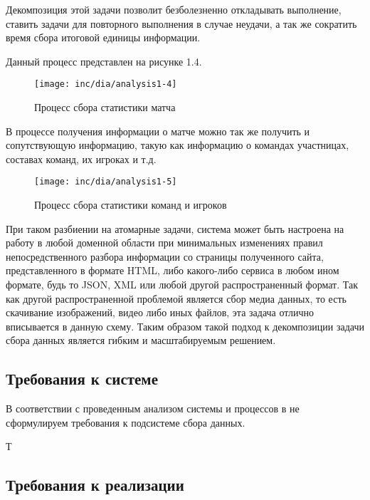 Декомпозиция этой задачи позволит безболезненно откладывать выполнение, ставить задачи для повторного выполнения в случае неудачи, а так же сократить время сбора итоговой единицы информации. 

Данный процесс представлен на рисунке 1.4.  
\begin{figure}
  \centering
  \texttt{[image: inc/dia/analysis1-4]}
  \caption{Процесс сбора статистики матча}
  \label{fig:fig04}
\end{figure}


В процессе получения информации о матче можно так же получить и сопутствующую информацию, такую как информацию о командах участницах, составах команд, их игроках и т.д.

\begin{figure}
  \centering
  \texttt{[image: inc/dia/analysis1-5]}
  \caption{Процесс сбора статистики команд и игроков}
  \label{fig:fig05}
\end{figure}

При таком разбиении на атомарные задачи, система может быть настроена на работу в любой доменной области при минимальных изменениях правил непосредственного разбора информации со страницы полученного сайта, представленного в формате HTML, либо какого-либо сервиса в любом ином формате, будь то JSON, XML или любой другой распространенный формат. Так как другой распространенной проблемой является сбор медиа данных, то есть скачивание изображений, видео либо иных файлов, эта задача отлично вписывается в данную схему. Таким образом такой подход к декомпозиции задачи сбора данных является гибким и масштабируемым решением.

\subsection{Требования к системе}
В соответствии с проведенным анализом системы и процессов в не сформулируем  требования к подсистеме сбора данных.

Т\subsection{Требования к реализации}

